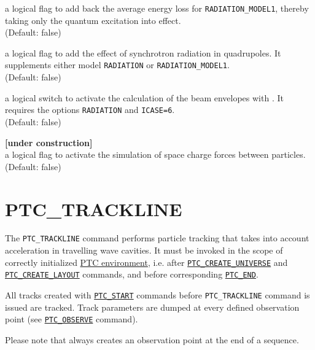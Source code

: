 \begin{madlist}
    a logical flag to add back the
   average energy loss for {\tt RADIATION\_MODEL1}, thereby taking only
   the quantum excitation into effect.\\ (Default: false)

    a logical flag to add the effect of
   synchrotron radiation in quadrupoles. It supplements either model
   {\tt RADIATION} or {\tt RADIATION\_MODEL1}. \\
   (Default: false)

    a logical switch to activate the calculation
   of the beam envelopes with \ptc. It requires the options
   {\tt RADIATION} and {\tt ICASE=6}.\\
   (Default: false)

    {\bf [under construction]}\\
     a logical flag to activate the simulation of space charge forces
     between particles. \\ (Default: false)  
\end{madlist}


\section{PTC\_TRACKLINE}
\label{sec:ptc-trackline}

The {\tt PTC\_TRACKLINE} command performs particle tracking that takes
into account acceleration in travelling wave cavities. 
It must be invoked in the scope of correctly initialized
\hyperref[chap:ptc-setup]{PTC environment}, 
i.e. after \hyperref[sec:ptc-create-universe]{\tt PTC\_CREATE\_UNIVERSE}
and \hyperref[sec:ptc-create-layout]{\tt PTC\_CREATE\_LAYOUT} commands, and before
corresponding \hyperref[sec:ptc-end]{\tt PTC\_END}. 

All tracks created with \hyperref[sec:ptc-start]{\tt PTC\_START}
commands before {\tt PTC\_TRACKLINE} command is issued are 
tracked. Track parameters are dumped at every defined observation point
(see \hyperref[sec:ptc-observe]{\tt PTC\_OBSERVE} command). 

Please note that \madx always creates an observation point at the end of a
sequence.


